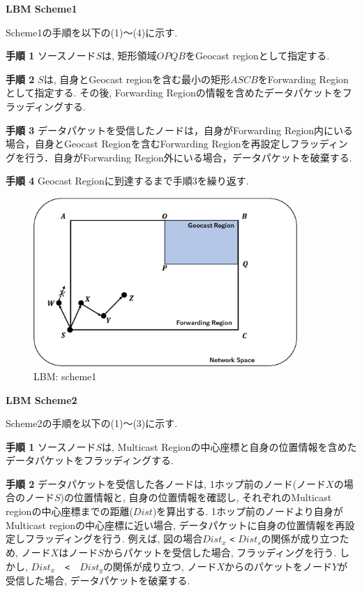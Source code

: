 \documentclass[10pt]{jreport}
\begin{document}
\par
\vspace{5mm}
\noindent
\textbf{LBM Scheme1}
\vspace{5mm}

Scheme1の手順を以下の(1)～(4)に示す.


\textbf{手順 1} ソースノード$S$は, 矩形領域$OPQB$をGeocast regionとして指定する.

\textbf{手順 2} $S$は, 自身とGeocast regionを含む最小の矩形$ASCB$をForwarding Regionとして指定する. その後, Forwarding Regionの情報を含めたデータパケットをフラッディングする.

\textbf{手順 3} データパケットを受信したノードは，自身がForwarding Region内にいる場合，自身とGeocast Regionを含むForwarding Regionを再設定しフラッディングを行う．自身がForwarding Region外にいる場合，データパケットを破棄する.

\textbf{手順 4} Geocast Regionに到達するまで手順3を繰り返す. 


\begin{figure}[!ht]
	\centering
	\includegraphics[width=100mm]{figures/Scheme1.eps}
	\caption{LBM: scheme1}
	\label{fig:scheme1}
\end{figure}

\par
\vspace{5mm}
\noindent
\textbf{LBM Scheme2}
\vspace{5mm}

Scheme2の手順を以下の(1)～(3)に示す.


\textbf{手順 1} ソースノード$S$は, Multicast Regionの中心座標と自身の位置情報を含めたデータパケットをフラッディングする.

\textbf{手順 2} データパケットを受信した各ノードは, 1ホップ前のノード(ノード$X$の場合のノード$S$)の位置情報と, 自身の位置情報を確認し, それぞれのMulticast regionの中心座標までの距離($Dist$)を算出する. 1ホップ前のノードより自身がMulticast regionの中心座標に近い場合, データパケットに自身の位置情報を再設定しフラッディングを行う.
例えば, 図の場合$Dist_x$ \verb|<| $Dist_s$の関係が成り立つため, ノード$X$はノード$S$からパケットを受信した場合, フラッディングを行う. しかし, $Dist_x$　\verb|<|　$Dist_y$の関係が成り立つ, ノード$X$からのパケットをノード$Y$が受信した場合, データパケットを破棄する.
\end{document}
